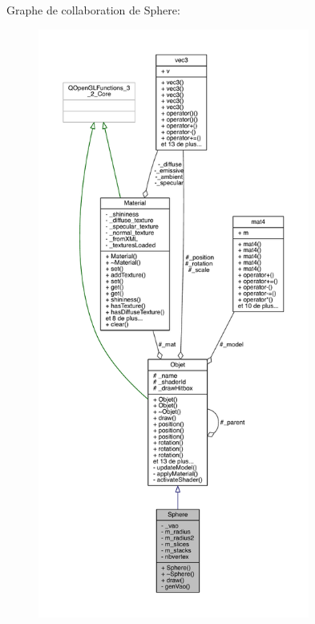 Graphe de collaboration de Sphere\+:
\nopagebreak
\begin{figure}[H]
\begin{center}
\leavevmode
\includegraphics[height=550pt]{class_sphere__coll__graph}
\end{center}
\end{figure}

